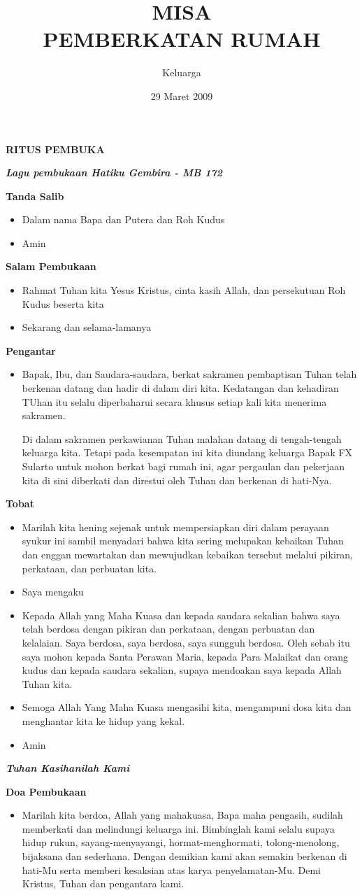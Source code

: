 \documentclass[12pt]{book}
\title{MISA \\PEMBERKATAN RUMAH}
\author{
Keluarga \keluarga \\
}
\date{29 Maret 2009}
\makeatletter
\newcommand{\judul}[1]{%
  {\parindent \z@ \centering \normalfont
    \interlinepenalty\@M \Large \bfseries #1\par\nobreak \vskip 20\p@ }}
\newcommand{\subjudul}[1]{%
  {\parindent \z@ \normalfont
    \interlinepenalty\@M \bfseries #1\par\nobreak \vskip 20\p@ }}
\newcommand{\lagu}[1]{%
  {\parindent \z@ \normalfont
    \interlinepenalty\@M \bfseries \emph{#1}\par\nobreak \vskip 20\p@ }}
\newcommand{\BU}[1]{\begin{itemize} \item[U:] #1 \end{itemize}}
\newcommand{\BI}[1]{\begin{itemize} \item[I:] #1 \end{itemize}}
\newcommand{\keluarga}{FX Sularto }
\makeatother
\begin{document}
\maketitle
\Large  
\thispagestyle{empty}
\newpage
\judul{RITUS PEMBUKA}

\lagu{Lagu pembukaan Hatiku Gembira - MB 172}

\subjudul{Tanda Salib}
\BI{Dalam nama Bapa dan Putera dan Roh Kudus}
\BU{Amin}

\subjudul{Salam Pembukaan}
\BI{Rahmat Tuhan kita Yesus Kristus, cinta kasih Allah, dan persekutuan Roh Kudus beserta kita}
\BU{Sekarang dan selama-lamanya}

\subjudul{Pengantar}
\BI{Bapak, Ibu, dan Saudara-saudara, berkat sakramen pembaptisan Tuhan telah berkenan datang dan hadir di dalam diri kita. Kedatangan dan kehadiran TUhan itu selalu diperbaharui secara khusus setiap kali kita menerima sakramen. 

Di dalam sakramen perkawianan Tuhan malahan datang di tengah-tengah keluarga kita. Tetapi pada kesempatan ini kita diundang keluarga Bapak \keluarga untuk mohon berkat bagi rumah ini, agar pergaulan dan pekerjaan kita di sini diberkati dan direstui oleh Tuhan dan berkenan di hati-Nya.}

\subjudul{Tobat}
\BI{Marilah kita hening sejenak untuk mempersiapkan diri dalam perayaan syukur ini sambil menyadari bahwa kita sering melupakan kebaikan Tuhan dan enggan mewartakan dan mewujudkan kebaikan tersebut melalui pikiran, perkataan, dan perbuatan kita.}

\BI{Saya mengaku}

\BU{Kepada Allah yang Maha Kuasa dan kepada saudara sekalian bahwa saya telah berdosa dengan pikiran dan perkataan, dengan perbuatan dan kelalaian. Saya berdosa, saya berdosa, saya sungguh berdosa. Oleh sebab itu saya mohon kepada Santa Perawan Maria, kepada Para Malaikat dan orang kudus dan kepada saudara sekalian, supaya mendoakan saya kepada Allah Tuhan kita.}

\BI{Semoga Allah Yang Maha Kuasa mengasihi kita, mengampuni dosa kita dan menghantar kita ke hidup yang kekal.}

\BU{Amin}

\lagu{Tuhan Kasihanilah Kami}

\subjudul{Doa Pembukaan}

\BI{Marilah kita berdoa,
Allah yang mahakuasa, Bapa maha pengasih, sudilah memberkati dan melindungi keluarga ini. Bimbinglah kami selalu supaya hidup rukun, sayang-menyayangi, hormat-menghormati, tolong-menolong, bijaksana dan sederhana. Dengan demikian kami akan semakin berkenan di hati-Mu serta memberi kesaksian atas karya penyelamatan-Mu. Demi Kristus, Tuhan dan pengantara kami.}
\end{document}
